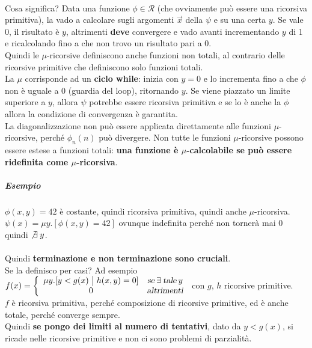 \documentclass[10pt]{book}
\begin{document}
\paragraph{} Cosa significa? Data una funzione $\phi \in \mathscr{R}$ (che ovviamente può essere una ricorsiva primitiva), la vado a calcolare sugli argomenti $\overrightarrow{x}$ della $\psi$ e su una certa $y$. Se vale 0, il risultato è $y$, altrimenti \textbf{deve} convergere e vado avanti incrementando $y$ di 1 e ricalcolando fino a che non trovo un risultato pari a 0.\\
Quindi le $\mu$-ricorsive definiscono anche funzioni non totali, al contrario delle ricorsive primitive che definiscono solo funzioni totali.\\
La $\mu$ corrisponde ad un \textbf{ciclo while}: inizia con $y=0$ e lo incrementa fino a che $\phi$ non è uguale a 0 (guardia del loop), ritornando $y$. Se viene piazzato un limite superiore a $y$, allora $\psi$ potrebbe essere ricorsiva primitiva e se lo è anche la $\phi$ allora la condizione di convergenza è garantita.\\
La diagonalizzazione non può essere applicata direttamente alle funzioni $\mu$-ricorsive, perché $\phi_n(n)$ può divergere. Non tutte le funzioni $\mu$-ricorsive possono essere estese a funzioni totali: \textbf{una funzione è $\mu$-calcolabile se può essere ridefinita come $\mu$-ricorsiva}.
\subparagraph{Esempio} $\phi(x, y) = 42$ è costante, quindi ricorsiva primitiva, quindi anche $\mu$-ricorsiva.\\
$\psi(x) = \mu y.[\phi(x, y) = 42]$ ovunque indefinita perché non tornerà mai 0 quindi $\not\exists\:y$.\\\\
Quindi \textbf{terminazione e non terminazione sono cruciali}.\\
Se la definisco per casi? Ad esempio 
\begin{math}
	f(x) = \left\{
	\begin{array}{c c}
	\mu y.[y < g(x)\:\:\vline\:\: h(x, y) = 0] & \textsl{se}\:\exists\:\textsl{tale}\:y\\
	0 & \textsl{altrimenti}
	\end{array}
	\right.
\end{math}
con $g$, $h$ ricorsive primitive.\\$f$ è ricorsiva primitiva, perché composizione di ricorsive primitive, ed è anche totale, perché converge sempre.\\
Quindi \textbf{se pongo dei limiti al numero di tentativi}, dato da $y < g(x)$, si ricade nelle ricorsive primitive e non ci sono problemi di parzialità.
\end{document}
